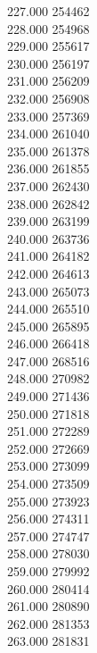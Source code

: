 { 227.000	254462 \\
 228.000	254968 \\
 229.000	255617 \\
 230.000	256197 \\
 231.000	256209 \\
 232.000	256908 \\
 233.000	257369 \\
 234.000	261040 \\
 235.000	261378 \\
 236.000	261855 \\
 237.000	262430 \\
 238.000	262842 \\
 239.000	263199 \\
 240.000	263736 \\
 241.000	264182 \\
 242.000	264613 \\
 243.000	265073 \\
 244.000	265510 \\
 245.000	265895 \\
 246.000	266418 \\
 247.000	268516 \\
 248.000	270982 \\
 249.000	271436 \\
 250.000	271818 \\
 251.000	272289 \\
 252.000	272669 \\
 253.000	273099 \\
 254.000	273509 \\
 255.000	273923 \\
 256.000	274311 \\
 257.000	274747 \\
 258.000	278030 \\
 259.000	279992 \\
 260.000	280414 \\
 261.000	280890 \\
 262.000	281353 \\
 263.000	281831 \\
}
